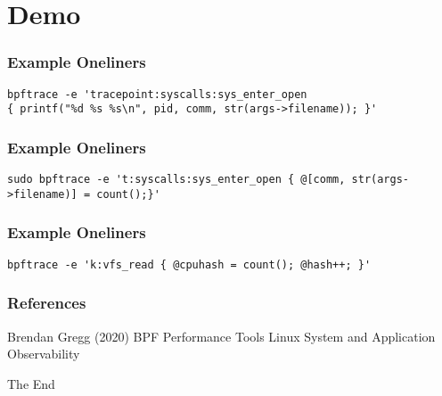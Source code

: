 \documentclass{beamer}
\begin{document}
\section{Demo}

\begin{frame}[fragile] %
\frametitle{Example Oneliners}
\begin{example}
\begin{verbatim}
bpftrace -e 'tracepoint:syscalls:sys_enter_open 
{ printf("%d %s %s\n", pid, comm, str(args->filename)); }'
\end{verbatim}
\end{example}
\end{frame}


\begin{frame}[fragile] %
\frametitle{Example Oneliners}
\begin{example}
\begin{verbatim}
sudo bpftrace -e 't:syscalls:sys_enter_open { @[comm, str(args->filename)] = count();}'
\end{verbatim}
\end{example}
\end{frame}


\begin{frame}[fragile] %
\frametitle{Example Oneliners}
\begin{example}[Concurrency]
\begin{verbatim}
bpftrace -e 'k:vfs_read { @cpuhash = count(); @hash++; }'
\end{verbatim}
\end{example}
\end{frame}


\begin{frame}
\frametitle{References}
\footnotesize{
\begin{thebibliography}{99} %
 Brendan Gregg (2020)
\newblock BPF Performance Tools
\newblock Linux System and Application Observability
\end{thebibliography}
}
\end{frame}


\begin{frame}
\Huge{\centerline{The End}}
\end{frame}

\end{document}
